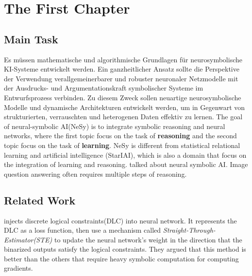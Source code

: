 \chapter{The First Chapter}



\section{Main Task}
Es müssen mathematische und algorithmische Grundlagen für neurosymbolische KI-Systeme entwickelt werden. Ein ganzheitlicher Ansatz sollte die Perspektive der Verwendung verallgemeinerbarer und robuster neuronaler Netzmodelle mit der Ausdrucks- und Argumentationskraft symbolischer Systeme im Entwurfsprozess verbinden. Zu diesem Zweck sollen neuartige neurosymbolische Modelle und dynamische Architekturen entwickelt werden, um in Gegenwart von strukturierten, verrauschten und heterogenen Daten effektiv zu lernen. 
The goal of neural-symbolic AI(NeSy) is to integrate symbolic reasoning and neural networks, where the first topic focus on the task of \textbf{reasoning} and the second topic focus on the task of \textbf{learning}. 
NeSy is different from statistical relational learning and artificial intelligence (StarIAI), which is also a domain that focus on the integration of learning and reasoning.
\cite{Susskind2021} talked about neural symbolic AI.
Image question answering often requires multiple steps of reasoning. \cite{SAN}


\section{Related Work}
\cite{yang22} injects discrete logical constraints(DLC) into neural network. It represents the DLC as a loss function, then use a mechanism called \textit{Straight-Through-Estimator(STE)} to update the neural network's weight in the direction that the binarized outputs satisfy the logical constraints. They argued that this method is better than the others that require heavy symbolic computation for computing gradients.